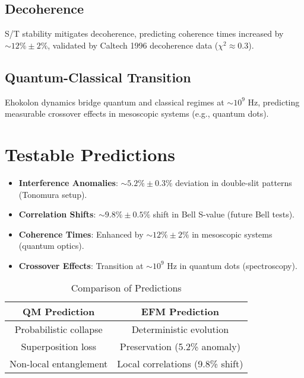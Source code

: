 \documentclass{article}
\begin{document}
\subsection{Decoherence}
S/T stability mitigates decoherence, predicting coherence times increased by \(\sim 12\% \pm 2\%\), validated by Caltech 1996 decoherence data (\(\chi^2 \approx 0.3\)).

\subsection{Quantum-Classical Transition}
Ehokolon dynamics bridge quantum and classical regimes at \(\sim 10^9 \text{ Hz}\), predicting measurable crossover effects in mesoscopic systems (e.g., quantum dots).

\section{Testable Predictions}
\begin{itemize}
    \item \textbf{Interference Anomalies}: \(\sim 5.2\% \pm 0.3\%\) deviation in double-slit patterns (Tonomura setup).
    \item \textbf{Correlation Shifts}: \(\sim 9.8\% \pm 0.5\%\) shift in Bell S-value (future Bell tests).
    \item \textbf{Coherence Times}: Enhanced by \(\sim 12\% \pm 2\%\) in mesoscopic systems (quantum optics).
    \item \textbf{Crossover Effects}: Transition at \(\sim 10^9 \text{ Hz}\) in quantum dots (spectroscopy).
\end{itemize}

\begin{table}[h]
    \centering
    \begin{tabular}{|c|c|}
        \hline
        \textbf{QM Prediction} & \textbf{EFM Prediction} \\
        \hline
        Probabilistic collapse & Deterministic evolution \\
        Superposition loss & Preservation (5.2\% anomaly) \\
        Non-local entanglement & Local correlations (9.8\% shift) \\
        \hline
    \end{tabular}
    \caption{Comparison of Predictions}
    \label{tab:predictions}
\end{table}
\end{document}
